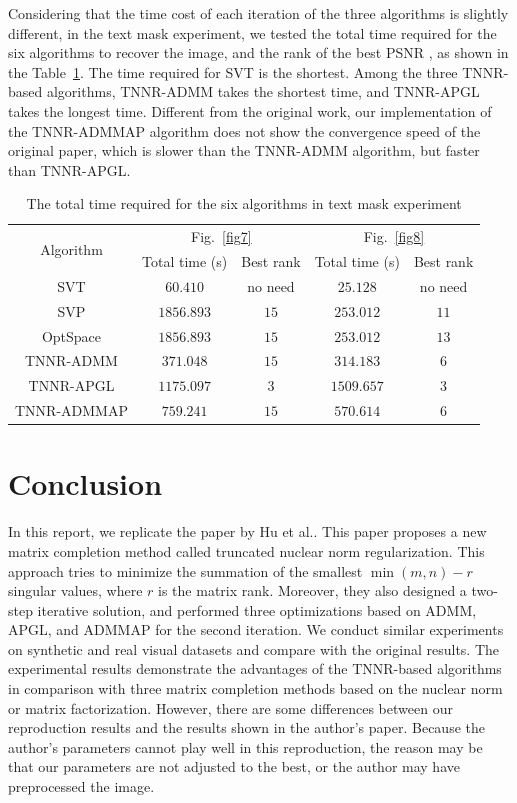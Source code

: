 \documentclass{article}
\begin{document}
{Considering that the time cost of each iteration of the three algorithms is slightly different, in the text mask experiment, we tested the total time required for the six algorithms to recover the image, and the rank of the best PSNR , as shown in the Table~\ref{t3}. The time required for SVT is the shortest. Among the three TNNR-based algorithms, TNNR-ADMM takes the shortest time, and TNNR-APGL takes the longest time. Different from the original work, our implementation of the TNNR-ADMMAP algorithm does not show the convergence speed of the original paper, which is slower than the TNNR-ADMM algorithm, but faster than TNNR-APGL.

\begin{table}
	\caption{The total time required for the six algorithms in text mask experiment}
	\label{t3}
	\centering
	\renewcommand{\arraystretch}{1.25} 
	\begin{tabular}{ccccc}
		\toprule
		\multirow{2}{*}{Algorithm}  & \multicolumn{2}{c}{Fig.~\ref{fig7}} & \multicolumn{2}{c}{Fig.~\ref{fig8}} \\
		\cmidrule(r){2-3} \cmidrule(r){4-5} 
		& Total time (s) & Best rank & Total time (s) & Best rank \\
		\midrule
		SVT & $60.410$ & no need &   $25.128$ &  no need \\
		SVP & $1856.893$ & $15$ & $253.012$ & $11$ \\
		OptSpace & $1856.893$ & $15$ & $253.012$ & $13$ \\
		TNNR-ADMM &  $371.048$ & $15$ & $314.183$ & $6$\\
		TNNR-APGL & $1175.097$ & $3$ & $1509.657$ & $3$\\
		TNNR-ADMMAP & $759.241$ & $15$ & $570.614$ & $6$\\
 		\bottomrule
	\end{tabular}
\end{table}

\section{Conclusion}
\label{s5}
In this report, we replicate the paper by Hu et al.\cite{hu.he201309}. This paper proposes a new matrix completion method called truncated nuclear
norm regularization. This approach tries to minimize the summation of the smallest $\min (m,n)-r$ singular values, where $r$ is the matrix rank. 
Moreover, they also designed a two-step iterative solution, and performed three optimizations based on ADMM, APGL, and ADMMAP for the second iteration. We conduct similar experiments on synthetic and real visual datasets and compare with the original results. The experimental results demonstrate the advantages of the TNNR-based algorithms in comparison with
three matrix completion methods based on the nuclear norm or matrix factorization. However, there are some differences between our reproduction results and the results shown in the author's paper. Because the author's parameters cannot play well in this reproduction, the reason may be that our parameters are not adjusted to the best, or the author may have preprocessed the image.



}
\end{document}
